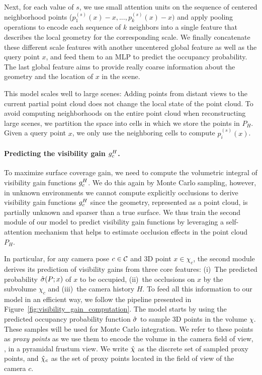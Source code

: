 Next, for each value of $s$, we use small attention units \cite{ashish-2017-attention, meng-20-pct} on the sequence of centered neighborhood points ($p^{(s)}_1(x) - x, ..., p^{(s)}_k(x) - x)$ and apply pooling operations to encode each sequence of $k$ neighbors into a single feature that describes the local geometry for the corresponding scale. We finally concatenate these different scale features with another uncentered global feature as well as the query point $x$, and feed them to an MLP to predict the occupancy probability. The last global feature aims to provide really coarse information about the geometry and the location of $x$ in the scene.

This model scales well to large scenes: Adding points from distant views to the current partial point cloud does not change the local state of the point cloud. 
 To avoid computing neighborhoods on the entire point cloud when reconstructing large scenes, we partition the space into cells in which we store the points in $P_H$. Given a query point $x$, we only use the neighboring cells to compute $p^{(s)}_i(x)$. %

\paragraph{Predicting the visibility gain $g^H_{c}$. } 
To maximize surface coverage gain, we need to compute the volumetric integral of visibility gain functions $g^H_{c}$. We do this again by Monte Carlo sampling, however, in unknown environments we cannot compute explicitly occlusions to derive visibility gain functions $g^H_{c}$ since the geometry, represented as a point cloud, is partially unknown and sparser than a true surface. We thus train the second module of our model to predict visibility gain functions by leveraging a self-attention mechanism that helps to estimate occlusion effects in the point cloud $P_H$.

In particular, for any camera pose $c\in {\cal C}$ and 3D point $x\in \chi_c$, the second module derives its prediction of visibility gains from three core features: (i)~The predicted probability $\hat{\sigma}(P; x)$ of $x$ to be occupied, (ii)~the occlusions on $x$ by the subvolume $\chi_c$ and (iii)~the camera history $H$. To feed all this information to our model in an efficient way, we follow the pipeline presented in Figure~\ref{fig:visibility_gain_computation}. The model starts by using the predicted occupancy probability function $\hat{\sigma}$ to sample 3D points in the volume $\chi$. These samples will be used for Monte Carlo integration. We refer to these points as \emph{proxy points} as we use them to encode the  volume in the camera field of view, \ie, in a pyramidal frustum view. We write $\hat{\chi}$ as the discrete set of sampled proxy points, and $\hat{\chi}_c$ as the set of proxy points located in the field of view of the camera $c$.

